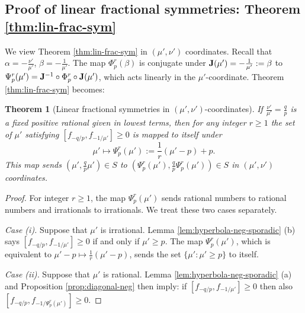 \documentclass[11pt, letterpaper, reqno]{amsart}
\newtheorem{thm}{Theorem}[section]
\newenvironment{customthm}[1]
  {\renewcommand\theinnercustomthm{#1}\innercustomthm}
  {\endinnercustomthm}
\theoremstyle{definition}
\theoremstyle{remark}
\numberwithin{equation}{section}
\newcommand{\bJ}{{\bf J}}
\newcommand{\uu}{{\mu'}}
\newcommand{\vv}{{\nu'}}
\newcommand{\mup}{{\mu'}}
\begin{document}

\subsection{Proof of linear fractional symmetries: Theorem \ref{thm:lin-frac-sym}}
\label{subsubsec:integer-contact-proof}


We view  Theorem \ref{thm:lin-frac-sym} in  $(\uu, \vv)$ coordinates.
Recall that $\alpha = -\frac{\vv}{\uu}$, $\beta=-\frac{1}{\uu}$.
The   map $\Phi_{p}^{r}(\beta)$ is conjugate  under $\bJ(\uu)= -\frac{1}{\uu} := \beta$ 
to $\Psi_{p}^r(\uu)= \bJ^{-1} \circ \Phi_{p}^r \circ \bJ (\uu) $, 
which  acts linearly  in the $\uu$-coordinate. 
Theorem \ref{thm:lin-frac-sym} becomes:

%
%
\begin{thm}[Linear fractional symmetries in $(\uu, \vv)$-coordinates]
\label{thm:lin-frac-sym-uv}
If $ \frac{\vv}{\uu} = \frac{q}{p}$ is a fixed positive rational given in lowest terms, 
then for any integer $r \ge 1$ the set of $\uu$ 
satisfying $[f_{-q/p},f_{-1/\uu}] \geq 0$ 
is mapped to itself under
\[ 
\uu \mapsto \Psi_{p}^r(\uu):=  
\frac{1}{r }\left( \uu - p \right)  + p.
\]
This map sends 
 $(\uu, \frac{q}{p} \uu) \in S $
to $( \Psi_{p}^r(\uu), \frac{q}{p}  \Psi_{p}^r(\uu)) \in S$ in $(\uu, \vv)$ coordinates.
\end{thm} 
\begin{proof}
For integer $r \ge 1$,
the map  $\Psi_{p}^r(\uu)$ sends rational numbers to rational numbers and  irrationals to irrationals.
We  treat these two cases separately.

{\em Case (i).} Suppose that $\uu$ is irrational. 
Lemma \ref{lem:hyperbola-neg-sporadic} (b) says  
$[f_{-q/p},f_{-1/\uu}] \geq 0$ if and only if $\uu \geq p$.
The map $\Psi_{p}^r(\mup)$, which is equivalent to $\uu - p \mapsto \frac{1}{r} (\uu - p)$, 
sends the  set $\{ \uu : \uu \geq p \}$ to itself.

{\em Case (ii).} Suppose that $\uu$ is rational. 
Lemma \ref{lem:hyperbola-neg-sporadic}  (a)
and Proposition \ref{prop:diagonal-neg} then
imply:
if $[f_{-q/p},f_{-1/\uu}] \geq 0$ then also  ${ [f_{-q/p},f_{-1/\Psi_{p}^r(\uu)}] \geq 0 }$.
\end{proof} 
\end{document}

